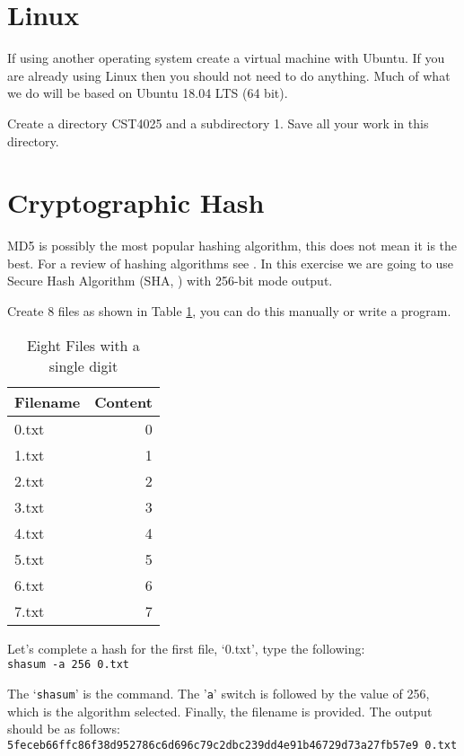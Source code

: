 
\section{Linux}
If using another operating system create a virtual machine with Ubuntu. If you are already using Linux then you should not need to do anything. Much of what we do will be based on Ubuntu 18.04 LTS (64 bit).

Create a directory CST4025 and a subdirectory 1. Save all your work in this directory. 


\section{Cryptographic Hash}
MD5 \cite{rivest:md5} is possibly the most popular hashing algorithm, this does not mean it is the best. For a review of hashing algorithms see \cite{rogaway:shrimpton, yaga2018blockchain}. In this exercise we are going to use Secure Hash Algorithm (SHA, \cite{sha1}) with 256-bit mode output.  

Create 8 files as shown in Table \ref{ta:ex1}, you can do this manually or write a program.

\begin{table}[tbh!]
	\centering
	\begin{tabular}{l|r}\hline
		{\bf Filename}	&	{\bf Content} \\ \hline \hline
		0.txt		&	0 \\
		1.txt		&	1 \\ 
		2.txt		&	2 \\ 
		3.txt		&	3 \\
		4.txt		&	4 \\
		5.txt		& 	5 \\
		6.txt		&	6 \\
		7.txt		&	7 \\ \hline
	\end{tabular}
	\caption{ Eight Files with a single digit}
	\label{ta:ex1}
\end{table}

Let's complete a hash for the first file, `0.txt', type the following: \\
{\tt shasum -a 256 0.txt}

The `{\tt shasum}' is the command. The '{\tt a}' switch is followed by the value of 256, which is the algorithm selected. Finally, the filename is provided. The output should be as follows:\\
{\tt\scriptsize 5feceb66ffc86f38d952786c6d696c79c2dbc239dd4e91b46729d73a27fb57e9  0.txt}\\
\normalsize

